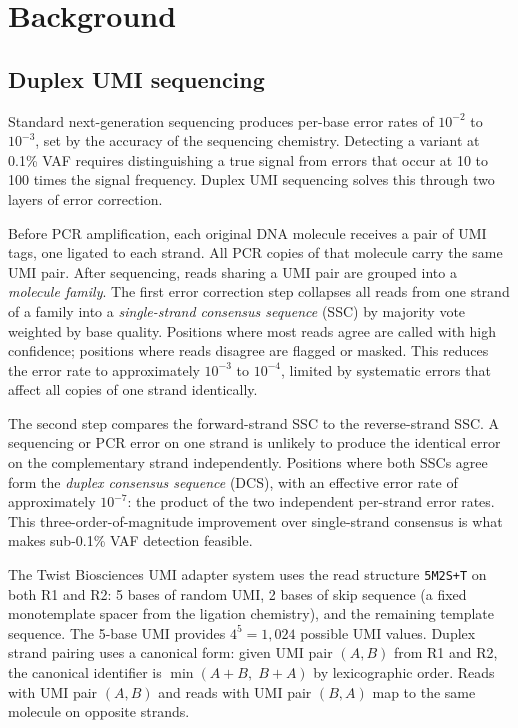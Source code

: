 \section{Background}
\label{sec:background}

\subsection{Duplex UMI sequencing}
\label{sec:bg-duplex}

Standard next-generation sequencing produces per-base error rates of $10^{-2}$ to $10^{-3}$, set by the accuracy of the sequencing chemistry.
Detecting a variant at 0.1\% VAF requires distinguishing a true signal from errors that occur at 10 to 100 times the signal frequency.
Duplex UMI sequencing solves this through two layers of error correction\autocite{Schmitt12duplex}.

Before PCR amplification, each original DNA molecule receives a pair of UMI tags, one ligated to each strand.
All PCR copies of that molecule carry the same UMI pair.
After sequencing, reads sharing a UMI pair are grouped into a \emph{molecule family}.
The first error correction step collapses all reads from one strand of a family into a \emph{single-strand consensus sequence} (SSC) by majority vote weighted by base quality.
Positions where most reads agree are called with high confidence; positions where reads disagree are flagged or masked.
This reduces the error rate to approximately $10^{-3}$ to $10^{-4}$, limited by systematic errors that affect all copies of one strand identically.

The second step compares the forward-strand SSC to the reverse-strand SSC.
A sequencing or PCR error on one strand is unlikely to produce the identical error on the complementary strand independently.
Positions where both SSCs agree form the \emph{duplex consensus sequence} (DCS), with an effective error rate of approximately $10^{-7}$: the product of the two independent per-strand error rates\autocite{Kennedy14duplex}.
This three-order-of-magnitude improvement over single-strand consensus is what makes sub-0.1\% VAF detection feasible.

The Twist Biosciences UMI adapter system\autocite{Twist22cfdna} uses the read structure \texttt{5M2S+T} on both R1 and R2: 5 bases of random UMI, 2 bases of skip sequence (a fixed monotemplate spacer from the ligation chemistry), and the remaining template sequence.
The 5-base UMI provides $4^5 = 1{,}024$ possible UMI values.
Duplex strand pairing uses a canonical form: given UMI pair $(A, B)$ from R1 and R2, the canonical identifier is $\min(A{+}B,\; B{+}A)$ by lexicographic order.
Reads with UMI pair $(A, B)$ and reads with UMI pair $(B, A)$ map to the same molecule on opposite strands.

